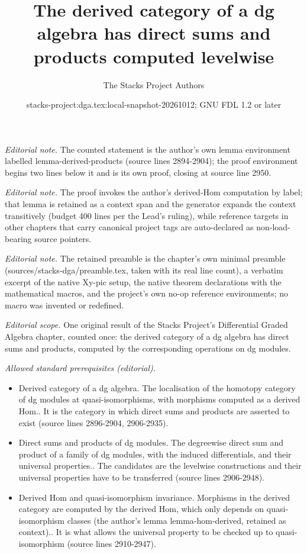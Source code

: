 \documentclass{stacks-project}
\title{The derived category of a dg algebra has direct sums and products computed levelwise}
\author{The Stacks Project Authors}
\date{stacks-project:dga.tex:local-snapshot-20261012; GNU FDL 1.2 or later}
\theoremstyle{plain}
\theoremstyle{definition}
\theoremstyle{remark}
\numberwithin{equation}{subsection}
\begin{document}
\maketitle
\noindent\textit{Editorial note.} The counted statement is the author's own lemma environment labelled lemma-derived-products (source lines 2894-2904); the proof environment begins two lines below it and is its own proof, closing at source line 2950.\par\medskip
\noindent\textit{Editorial note.} The proof invokes the author's derived-Hom computation by label; that lemma is retained as a context span and the generator expands the context transitively (budget 400 lines per the Lead's ruling), while reference targets in other chapters that carry canonical project tags are auto-declared as non-load-bearing source pointers.\par\medskip
\noindent\textit{Editorial note.} The retained preamble is the chapter's own minimal preamble (sources/stacks-dga/preamble.tex, taken with its real line count), a verbatim excerpt of the native Xy-pic setup, the native theorem declarations with the mathematical macros, and the project's own no-op reference environments; no macro was invented or redefined.\par\medskip
\noindent\textit{Editorial scope.} One original result of the Stacks Project's Differential Graded Algebra chapter, counted once: the derived category of a dg algebra has direct sums and products, computed by the corresponding operations on dg modules.\par\medskip
\noindent\textit{Allowed standard prerequisites (editorial).}\begin{itemize}
\item Derived category of a dg algebra. The localisation of the homotopy category of dg modules at quasi-isomorphisms, with morphisms computed as a derived Hom.. It is the category in which direct sums and products are asserted to exist (source lines 2896-2904, 2906-2935).
\item Direct sums and products of dg modules. The degreewise direct sum and product of a family of dg modules, with the induced differentials, and their universal properties.. The candidates are the levelwise constructions and their universal properties have to be transferred (source lines 2906-2948).
\item Derived Hom and quasi-isomorphism invariance. Morphisms in the derived category are computed by the derived Hom, which only depends on quasi-isomorphism classes (the author's lemma lemma-hom-derived, retained as context).. It is what allows the universal property to be checked up to quasi-isomorphism (source lines 2910-2947).
\end{itemize}\medskip
\end{document}

